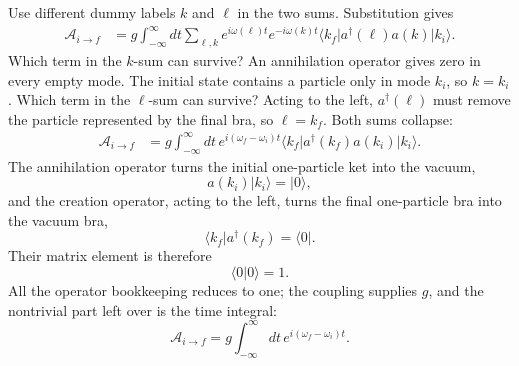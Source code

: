 \begin{classroomqa}
\end{classroomqa}

Use different dummy labels \(k\) and \(\ell\) in the two sums. Substitution gives
\begin{align}
\mathcal A_{i\to f}
&=g\int_{-\infty}^{\infty}dt
\sum_{\ell,k}
e^{i\omega(\ell)t}e^{-i\omega(k)t}
\langle k_f\rvert a^\dagger(\ell)a(k)\lvert k_i\rangle.
\end{align}
Which term in the \(k\)-sum can survive? An annihilation operator gives zero in every empty mode. The initial state contains a particle only in mode \(k_i\), so \(k=k_i\). Which term in the \(\ell\)-sum can survive? Acting to the left, \(a^\dagger(\ell)\) must remove the particle represented by the final bra, so \(\ell=k_f\). Both sums collapse:
\begin{align}
\mathcal A_{i\to f}
&=g\int_{-\infty}^{\infty}dt\,
e^{i(\omega_f-\omega_i)t}
\langle k_f\rvert a^\dagger(k_f)a(k_i)\lvert k_i\rangle.
\end{align}
The annihilation operator turns the initial one-particle ket into the vacuum,
\begin{equation}
a(k_i)\lvert k_i\rangle=\lvert0\rangle,
\end{equation}
and the creation operator, acting to the left, turns the final one-particle bra into the vacuum bra,
\begin{equation}
\langle k_f\rvert a^\dagger(k_f)=\langle0\rvert.
\end{equation}
Their matrix element is therefore
\begin{equation}
\langle0\vert0\rangle=1.
\end{equation}
All the operator bookkeeping reduces to one; the coupling supplies \(g\), and the nontrivial part left over is the time integral:
\begin{equation}
\mathcal A_{i\to f}
=g\int_{-\infty}^{\infty}dt\,
e^{i(\omega_f-\omega_i)t}.
\end{equation}


